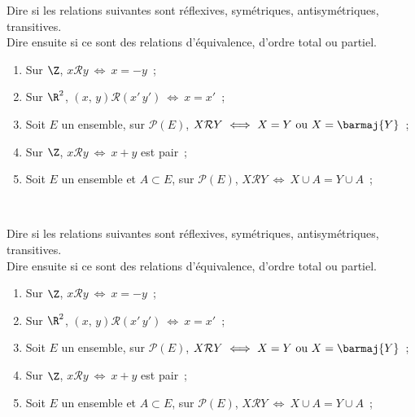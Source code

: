 \documentclass[a4paper,12pt]{article}
\begin{document}
	
\exo{}

Dire si les relations suivantes sont réflexives, symétriques, antisymétriques, transitives.\\

Dire ensuite si ce sont des relations d'équivalence, d'ordre total ou partiel.\\

\begin{enumerate}[\bfseries 1.]
	\item 	Sur $\Z$, $x\mathcal{R}y\ \Longleftrightarrow\  x=-y$\ ;
	\item 	Sur $\R^2$, $(x,\,y)\mathcal{R}(x'\,y')\ \Longleftrightarrow\ x=x'$\ ;
    \item 	Soit $E$ un ensemble, sur $\mathcal{P}(E)$, $X\mathcal{R}Y\ \Longleftrightarrow\ X=Y\ \text{ou}\ X = \barmaj{Y}$\ ;
    \item 	Sur $\Z$, $x\mathcal{R}y\ \Longleftrightarrow\  x+y$ est pair\ ;
    \item 	Soit $E$ un ensemble et $A\subset E$, sur $\mathcal{P}(E)$, $X\mathcal{R}Y\ \Longleftrightarrow\ X\cup A=Y\cup A$\ ;
        
\end{enumerate}

\ \\[7em]

	
\exo{}

Dire si les relations suivantes sont réflexives, symétriques, antisymétriques, transitives.\\

Dire ensuite si ce sont des relations d'équivalence, d'ordre total ou partiel.\\

\begin{enumerate}[\bfseries 1.]
	\item 	Sur $\Z$, $x\mathcal{R}y\ \Longleftrightarrow\  x=-y$\ ;
	\item 	Sur $\R^2$, $(x,\,y)\mathcal{R}(x'\,y')\ \Longleftrightarrow\ x=x'$\ ;
    \item 	Soit $E$ un ensemble, sur $\mathcal{P}(E)$, $X\mathcal{R}Y\ \Longleftrightarrow\ X=Y\ \text{ou}\ X = \barmaj{Y}$\ ;
    \item 	Sur $\Z$, $x\mathcal{R}y\ \Longleftrightarrow\  x+y$ est pair\ ;
    \item 	Soit $E$ un ensemble et $A\subset E$, sur $\mathcal{P}(E)$, $X\mathcal{R}Y\ \Longleftrightarrow\ X\cup A=Y\cup A$\ ;
        
\end{enumerate}
\end{document}
